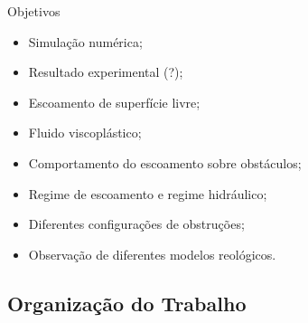 \begin{frame}
    \begin{exampleblock}{Objetivos}
        \begin{itemize}
            \item Simulação numérica;\pause
            \item Resultado experimental (?);\pause
            \item Escoamento de superfície livre;\pause
            \item Fluido viscoplástico;\pause
            \item Comportamento do escoamento sobre obstáculos;\pause
            \item Regime de escoamento e regime hidráulico; \pause
            \item Diferentes configurações de obstruções;\pause
            \item Observação de diferentes modelos reológicos.
        \end{itemize}
    \end{exampleblock}
\end{frame}

\subsection{Organização do Trabalho}

